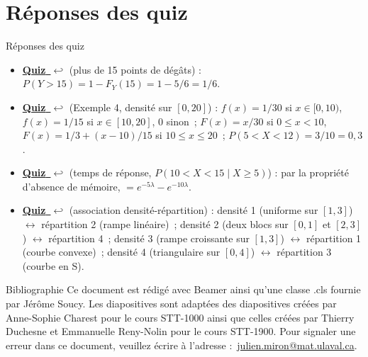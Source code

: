 \documentclass{BeamerTemplate}
\newcommand{\retour}[2]{\hyperlink{#1}{\textbf{#2}~{\color{gray}$\hookleftarrow$}}}
\begin{document}
\section{Réponses des quiz}

\begin{frame}[t,label=rep-quiz]{Réponses des quiz}
\footnotesize
\begin{itemize}
\item \retour{quizgain}{Quiz} (plus de 15 points de dégâts) : $P(Y>15)=1-F_Y(15)=1-5/6=1/6$.
\item \retour{ex4}{Quiz} (Exemple 4, densité sur $[0,20]$) : $f(x)=1/30$ si $x\in[0,10)$, $f(x)=1/15$ si
$x\in[10,20]$, 0 sinon~; $F(x)=x/30$ si $0\le x<10$, $F(x)=1/3+(x-10)/15$ si $10\le x\le20$~;
$P(5<X<12)=3/10=0{,}3$.
\item \retour{quizmemoire}{Quiz} (temps de réponse, $P(10<X<15\mid X\ge5)$) : par la propriété d'absence de mémoire,
$=e^{-5\lambda}-e^{-10\lambda}$.
\item \retour{quizassoc}{Quiz} (association densité-répartition) : densité 1 (uniforme sur $[1,3]$)
$\leftrightarrow$ répartition 2 (rampe linéaire)~; densité 2 (deux blocs sur $[0,1]$ et $[2,3]$)
$\leftrightarrow$ répartition 4~; densité 3 (rampe croissante sur $[1,3]$) $\leftrightarrow$ répartition 1
(courbe convexe)~; densité 4 (triangulaire sur $[0,4]$) $\leftrightarrow$ répartition 3 (courbe en S).
\end{itemize}

\end{frame}

\begin{frame}{Bibliographie}
 	Ce document est rédigé avec Beamer ainsi qu'une classe .cls fournie par Jérôme Soucy. Les diapositives sont adaptées des diapositives créées par Anne-Sophie Charest
 pour le cours STT-1000 ainsi que celles créées par Thierry Duchesne et Emmanuelle Reny-Nolin pour le cours STT-1900.
 	\printbibliography
 	\vfill
 	\footnotesize Pour signaler une erreur dans ce document, veuillez écrire à l'adresse :~\href{mailto:julien.miron@mat.ulaval.ca}{julien.miron@mat.ulaval.ca}.
 \end{frame}
\end{document}
